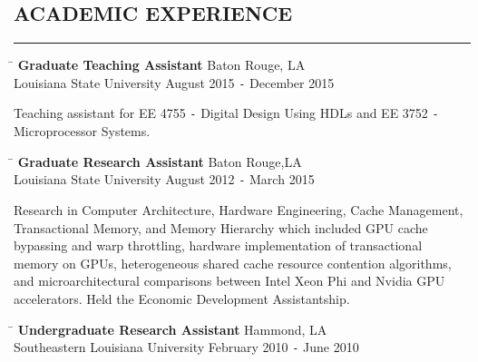 \documentclass{res}
\begin{document}
\begin{resume}
\section{ACADEMIC EXPERIENCE}
	\vspace{0.005in}	
	\rule{\textwidth}{0.5pt}
	\vspace{-0.4in}
	\begin{tabbing}
		\hspace{4.65in}\= \kill %
		{\bf Graduate Teaching Assistant} \> \hspace{0.3in}Baton Rouge, LA \\
		Louisiana State University \hspace{2.5in} August 2015 \texttt{-} December 2015
	\end{tabbing}\vspace{-20pt}
	\vspace{8pt}Teaching assistant for EE 4755 \texttt{-} Digital Design Using HDLs and EE 3752 \texttt{-} Microprocessor Systems.
	\vspace{-0.35in}
	\begin{tabbing}
		\hspace{4.38in}\=  \kill %
		{\bf Graduate Research Assistant}\> \hspace{0.62in}Baton Rouge,LA \\
		Louisiana State University     \>August 2012 \texttt{-} March 2015
	\end{tabbing}\vspace{-20pt}      %
	\vspace{8pt}Research in Computer Architecture, Hardware Engineering, Cache Management, Transactional Memory, and Memory Hierarchy which included GPU cache bypassing and warp throttling, hardware implementation of transactional memory on GPUs, heterogeneous shared cache resource contention algorithms, and microarchitectural comparisons between Intel Xeon Phi and Nvidia GPU accelerators. Held the Economic Development Assistantship.
	\vspace{-0.2in}
	\begin{tabbing}
		\hspace{4.35in}\= \kill %
		{\bf Undergraduate Research Assistant} \>\hspace{0.75in}Hammond, LA\\
		Southeastern Louisiana University \hspace{2.2in} February 2010 \texttt{-} June 2010
		

\end{tabbing}
\end{resume}
\end{document}
